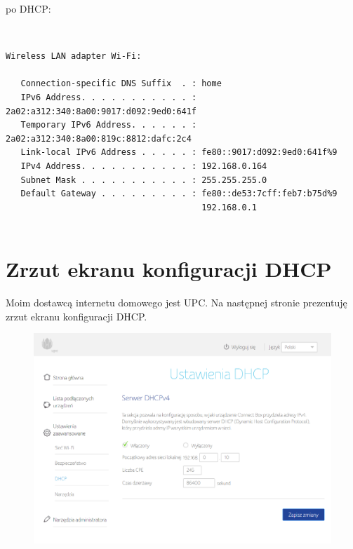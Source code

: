 \documentclass[a4paper,11pt]{article}
\begin{document}
po DHCP:

{\tt
\begin{verbatim}
Wireless LAN adapter Wi-Fi:

   Connection-specific DNS Suffix  . : home
   IPv6 Address. . . . . . . . . . . : 2a02:a312:340:8a00:9017:d092:9ed0:641f
   Temporary IPv6 Address. . . . . . : 2a02:a312:340:8a00:819c:8812:dafc:2c4
   Link-local IPv6 Address . . . . . : fe80::9017:d092:9ed0:641f%9
   IPv4 Address. . . . . . . . . . . : 192.168.0.164
   Subnet Mask . . . . . . . . . . . : 255.255.255.0
   Default Gateway . . . . . . . . . : fe80::de53:7cff:feb7:b75d%9
                                       192.168.0.1
   
\end{verbatim}
}

\section{Zrzut ekranu konfiguracji DHCP}

Moim dostawcą internetu domowego jest UPC. Na następnej stronie prezentuję zrzut ekranu konfiguracji DHCP.


\begin{figure}[h!]
\includegraphics[scale=0.7]{ekran-konfiguracji}
\end{figure}
\end{document}
